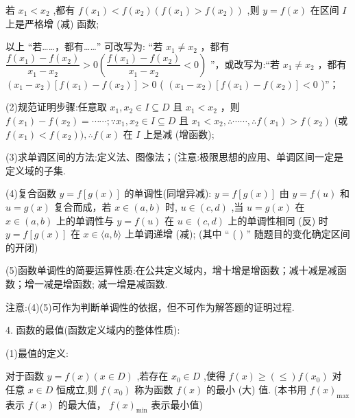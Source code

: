 若 ${x}_{1} < {x}_{2}$ ,都有 $f\left( {x}_{1}\right)  < f\left( {x}_{2}\right) \left( {f\left( {x}_{1}\right)  > f\left( {x}_{2}\right) }\right)$ ,则 $y = f\left( x\right)$ 在区间 $I$ 上是严格增 (减) 函数;

以上 “若……，都有……” 可改写为: “若 ${x}_{1} \neq  {x}_{2}$ ，都有 $\dfrac{f\left( {x}_{1}\right)  - f\left( {x}_{2}\right) }{{x}_{1} - {x}_{2}} > 0\left( {\dfrac{f\left( {x}_{1}\right)  - f\left( {x}_{2}\right) }{{x}_{1} - {x}_{2}} < 0}\right)$ ”，或改写为:“若 ${x}_{1} \neq  {x}_{2}$ ，都有 $\left( {{x}_{1} - {x}_{2}}\right) \left\lbrack  {f\left( {x}_{1}\right)  - f\left( {x}_{2}\right) }\right\rbrack   > 0$ ( $\left( {{x}_{1} - {x}_{2}}\right) \left\lbrack  {f\left( {x}_{1}\right)  - f\left( {x}_{2}\right) }\right\rbrack   < 0$ )”；

(2)规范证明步骤:任意取 ${x}_{1},{x}_{2} \in  I \subseteq  D$ 且 ${x}_{1} < {x}_{2}$ ，则 $f\left( {x}_{1}\right)  - f\left( {x}_{2}\right)  = \cdots \cdots ;\because {x}_{1},{x}_{2} \in  I \subseteq  D$ 且 ${x}_{1} < {x}_{2},\therefore \cdots \cdots ,\therefore f\left( {x}_{1}\right)  > f\left( {x}_{2}\right)$ (或 $f\left( {x}_{1}\right)  < f\left( {x}_{2}\right) ),\therefore f\left( x\right)$ 在 $I$ 上是减 (增函数);

(3)求单调区间的方法:定义法、图像法；(注意:极限思想的应用、单调区间一定是定义域的子集.

(4)复合函数 $y = f\left\lbrack  {g\left( x\right) }\right\rbrack$ 的单调性(同增异减): $y = f\left\lbrack  {g\left( x\right) }\right\rbrack$ 由 $y = f\left( u\right)$ 和 $u = g\left( x\right)$ 复合而成，若 $x \in  \left( {a,b}\right)$ 时, $u \in  \left( {c,d}\right)$ ,当 $u = g\left( x\right)$ 在 $x \in  \left( {a,b}\right)$ 上的单调性与 $y = f\left( u\right)$ 在 $u \in  \left( {c,d}\right)$ 上的单调性相同 (反) 时 $y = f\left\lbrack  {g\left( x\right) }\right\rbrack$ 在 $x \in  \langle a,b\rangle$ 上单调递增 (减); (其中 “ ( ) ” 随题目的变化确定区间的开闭)

(5)函数单调性的简要运算性质:在公共定义域内，增十增是增函数；减十减是减函数；增一减是增函数; 减一增是减函数.

注意:(4)(5)可作为判断单调性的依据，但不可作为解答题的证明过程.

4. 函数的最值(函数定义域内的整体性质):

(1)最值的定义:

对于函数 $y = f\left( x\right) \left( {x \in  D}\right)$ ,若存在 ${x}_{0} \in  D$ ,使得 $f\left( x\right)  \geq  \left(  \leq  \right) f\left( {x}_{0}\right)$ 对任意 $x \in  D$ 恒成立,则 $f\left( {x}_{0}\right)$ 称为函数 $f\left( x\right)$ 的最小 (大) 值. (本书用 $f{\left( x\right) }_{\max }$ 表示 $f\left( x\right)$ 的最大值， $f{\left( x\right) }_{\min }$ 表示最小值)

